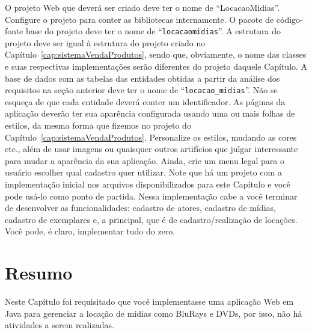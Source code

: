 O projeto Web que deverá ser criado deve ter o nome de ``LocacaoMidias''. Configure o projeto para conter as bibliotecas internamente. O pacote de código-fonte base do projeto deve ter o nome de ``\texttt{locacaomidias}''. A estrutura do projeto deve ser igual à estrutura do projeto criado no Capítulo~\ref{cap:sistemaVendaProdutos}, sendo que, obviamente, o nome das classes e suas respectivas implementações serão diferentes do projeto daquele Capítulo. A base de dados com as tabelas das entidades obtidas a partir da análise dos requisitos na seção anterior deve ter o nome de ``\texttt{locacao\_midias}''. Não se esqueça de que cada entidade deverá conter um identificador. As páginas da aplicação deverão ter sua aparência configurada usando uma ou mais folhas de estilos, da mesma forma que fizemos no projeto do Capítulo~\ref{cap:sistemaVendaProdutos}. Personalize os estilos, mudando as cores etc., além de usar imagens ou quaisquer outros artifícios que julgar interessante para mudar a aparência da sua aplicação. Ainda, crie um menu legal para o usuário escolher qual cadastro quer utilizar. Note que há um projeto com a implementação inicial nos arquivos disponibilizados para este Capítulo e você pode usá-lo como ponto de partida. Nessa implementação cabe a você terminar de desenvolver as funcionalidades: cadastro de atores, cadastro de mídias, cadastro de exemplares e, a principal, que é de cadastro/realização de locações. Você pode, é claro, implementar tudo do zero.


\section{Resumo}

Neste Capítulo foi requisitado que você implementasse uma aplicação Web em Java para gerenciar a locação de mídias como BluRays e DVDs, por isso, não há atividades a serem realizadas.
